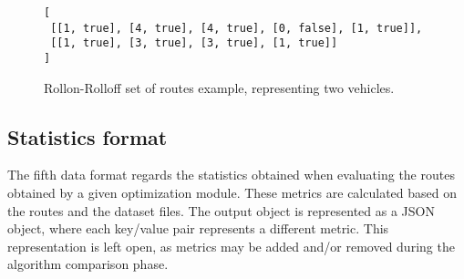 \begin{figure}[th]
  \begin{center}
    \leavevmode
      \begin{minipage}{14cm}
    \begin{verbatim}
[
 [[1, true], [4, true], [4, true], [0, false], [1, true]],
 [[1, true], [3, true], [3, true], [1, true]]
]
    \end{verbatim}
    \end{minipage}
    \caption{Rollon-Rolloff set of routes example, representing two vehicles.}
    \label{fig:routes-example-rr}
  \end{center}
\end{figure}




\newpage
\subsection{Statistics format}
\label{section:statistics-format}

The fifth data format regards the statistics obtained when evaluating the
routes obtained by a given optimization module. These metrics are calculated
based on the routes and the dataset files. The output object is represented as
a JSON object, where each key/value pair represents a different metric. This
representation is left open, as metrics may be added and/or removed during the
algorithm comparison phase.



